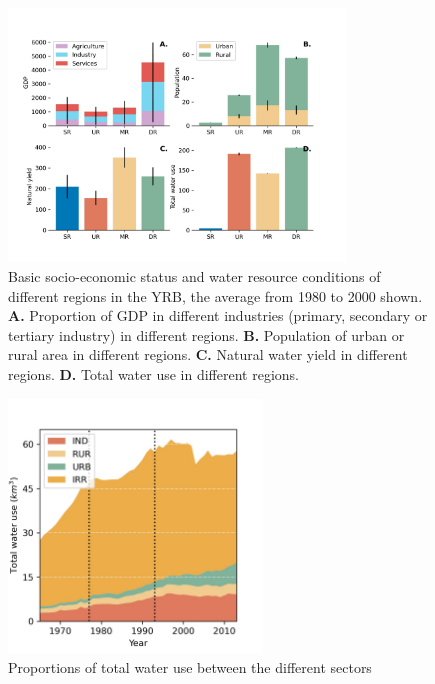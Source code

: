 \documentclass[9pt,twoside,lineno]{pnas-new}
\begin{document}
\begin{figure}
    \centering
    \includegraphics[width=0.8\textwidth]{../../figures/sup/region_differences.jpg}
    \caption{
        Basic socio-economic status and water resource conditions of different regions in the YRB, the average from 1980 to 2000 shown.
        \textbf{A.} Proportion of GDP in different industries (primary, secondary or tertiary industry) in different regions.
        \textbf{B.} Population of urban or rural area in different regions.
        \textbf{C.} Natural water yield in different regions.
        \textbf{D.} Total water use in different regions.
    }
\end{figure}

\begin{figure}
    \centering
    \includegraphics[width=0.6\textwidth]{../../figures/sup/sf_wu_sections_stackplot.jpg}
    \caption{Proportions of total water use between the different sectors}
\end{figure}
\end{document}
